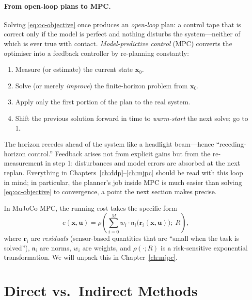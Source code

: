 \documentclass[11pt,twoside]{report}
\theoremstyle{definition}
\theoremstyle{plain}
\theoremstyle{remark}
\newcommand{\x}{\bm{x}}
\newcommand{\uu}{\bm{u}}
\newcommand{\rr}{\bm{r}}
\newcommand{\0}{\bm{0}}
\begin{document}
\paragraph{From open-loop plans to MPC.}
Solving \eqref{eq:oc-objective} once produces an \emph{open-loop} plan:
a control tape that is correct only if the model is perfect and nothing
disturbs the system---neither of which is ever true with contact.
\emph{Model-predictive control} (MPC) converts the optimiser into a
feedback controller by re-planning constantly:
\begin{enumerate}
\item Measure (or estimate) the current state $\x_{0}$.
\item Solve (or merely \emph{improve}) the finite-horizon problem from
      $\x_{0}$.
\item Apply only the first portion of the plan to the real system.
\item Shift the previous solution forward in time to \emph{warm-start}
      the next solve; go to 1.
\end{enumerate}
The horizon recedes ahead of the system like a headlight beam---hence
``receding-horizon control.'' Feedback arises not from explicit gains
but from the re-measurement in step 1: disturbances and model errors
are absorbed at the next replan. Everything in
Chapters~\ref{ch:ddp}--\ref{ch:mjpc} should be read with this loop in
mind; in particular, the planner's job inside MPC is much easier than
solving \eqref{eq:oc-objective} to convergence, a point the next
section makes precise.

\begin{insightbox}
In MuJoCo MPC, the running cost takes the specific form
\begin{equation}\label{eq:mjpc-cost}
c(\x,\uu)=\rho\!\left(\sum_{i=0}^{M}w_{i}\cdot\mathsf{n}_{i}\bigl(\rr_{i}(\x,\uu)\bigr);\;R\right),
\end{equation}
where $\rr_{i}$ are \emph{residuals} (sensor-based quantities that are
``small when the task is solved''), $\mathsf{n}_{i}$ are norms, $w_{i}$
are weights, and $\rho(\cdot;R)$ is a risk-sensitive exponential
transformation.  We will unpack this in Chapter~\ref{ch:mjpc}.
\end{insightbox}

\section{Direct vs.\ Indirect Methods}
\end{document}
